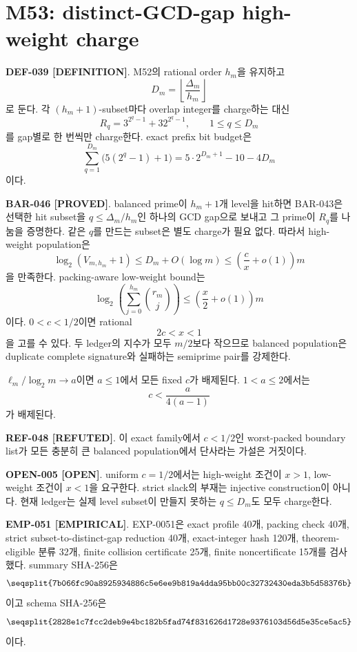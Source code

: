 \documentclass[11pt]{article}
\newcommand{\claimstatus}[2]{\textbf{#1 [#2]}}
\begin{document}
\section{M53: distinct-GCD-gap high-weight charge}

\claimstatus{DEF-039}{DEFINITION}.
M52의 rational order \(h_m\)을 유지하고
\[
D_m=\left\lfloor\frac{\Delta_m}{h_m}\right\rfloor
\tag{M53.1}
\]
로 둔다. 각 \((h_m+1)\)-subset마다 overlap integer를 charge하는 대신
\[
R_q=3^{2^q-1}+32^{2^q-1},\qquad 1\le q\le D_m
\tag{M53.2}
\]
를 gap별로 한 번씩만 charge한다. exact prefix bit budget은
\[
\sum_{q=1}^{D_m}\bigl(5(2^q-1)+1\bigr)
=5\cdot2^{D_m+1}-10-4D_m
\tag{M53.3}
\]
이다.

\claimstatus{BAR-046}{PROVED}.
balanced prime이 \(h_m+1\)개 level을 hit하면 BAR-043은 선택한 hit
subset을 \(q\le\Delta_m/h_m\)인 하나의 GCD gap으로 보내고 그 prime이
\(R_q\)를 나눔을 증명한다. 같은 \(q\)를 만드는 subset은 별도 charge가
필요 없다. 따라서 high-weight population은
\[
\log_2(V_{m,h_m}+1)
\le D_m+O(\log m)
\le\left(\frac{c}{x}+o(1)\right)m
\tag{M53.4}
\]
을 만족한다. packing-aware low-weight bound는
\[
\log_2\left(\sum_{j=0}^{h_m}\binom{r_m}{j}\right)
\le\left(\frac{x}{2}+o(1)\right)m
\tag{M53.5}
\]
이다. \(0<c<1/2\)이면 rational
\[
2c<x<1
\tag{M53.6}
\]
을 고를 수 있다. 두 ledger의 지수가 모두 \(m/2\)보다 작으므로
balanced population은 duplicate complete signature와 실패하는
semiprime pair를 강제한다.

\(\ell_m/\log_2m\to a\)이면 \(a\le1\)에서 모든 fixed \(c\)가
배제된다. \(1<a\le2\)에서는
\[
c<\frac{a}{4(a-1)}
\tag{M53.7}
\]
가 배제된다.

\claimstatus{REF-048}{REFUTED}.
이 exact family에서 \(c<1/2\)인 worst-packed boundary list가 모든
충분히 큰 balanced population에서 단사라는 가설은 거짓이다.

\claimstatus{OPEN-005}{OPEN}.
uniform \(c=1/2\)에서는 high-weight 조건이 \(x>1\), low-weight
조건이 \(x<1\)을 요구한다. strict slack의 부재는 injective
construction이 아니다. 현재 ledger는 실제 level subset이 만들지
못하는 \(q\le D_m\)도 모두 charge한다.

\claimstatus{EMP-051}{EMPIRICAL}.
EXP-0051은 exact profile 40개, packing check 40개, strict
subset-to-distinct-gap reduction 40개, exact-integer hash 120개,
theorem-eligible 분류 32개, finite collision certificate 25개,
finite noncertificate 15개를 검사했다. summary SHA-256은
\[
\texttt{\seqsplit{7b066fc90a8925934886c5e6ee9b819a4dda95bb00c32732430eda3b5d58376b}}
\]
이고 schema SHA-256은
\[
\texttt{\seqsplit{2828e1c7fcc2deb9e4bc182b5fad74f831626d1728e9376103d56d5e35ce5ac5}}
\]
이다.
\end{document}
